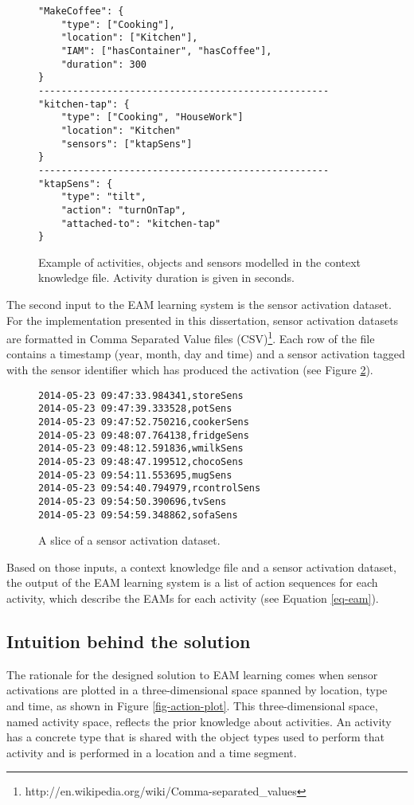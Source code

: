 \begin{figure}[htbp]
\begin{small}
\begin{lstlisting}
"MakeCoffee": {
	"type": ["Cooking"],
	"location": ["Kitchen"],
	"IAM": ["hasContainer", "hasCoffee"],
	"duration": 300
}
---------------------------------------------------
"kitchen-tap": {
	"type": ["Cooking", "HouseWork"]
	"location": "Kitchen"
	"sensors": ["ktapSens"]
}
---------------------------------------------------
"ktapSens": {
	"type": "tilt",
	"action": "turnOnTap",
	"attached-to": "kitchen-tap"
}
\end{lstlisting}
\end{small}
\caption{Example of activities, objects and sensors modelled in the context knowledge file. Activity duration is given in seconds.}
\label{fig-context-json}
\end{figure}

The second input to the EAM learning system is the sensor activation dataset. For the implementation presented in this dissertation, sensor activation datasets are formatted in Comma Separated Value files (CSV)\footnote{http://en.wikipedia.org/wiki/Comma-separated\_values}. Each row of the file contains a timestamp (year, month, day and time) and a sensor activation tagged with the sensor identifier which has produced the activation (see Figure \ref{fig-dataset}).


\begin{figure}[htbp]
\begin{small}
\begin{lstlisting}
2014-05-23 09:47:33.984341,storeSens
2014-05-23 09:47:39.333528,potSens
2014-05-23 09:47:52.750216,cookerSens
2014-05-23 09:48:07.764138,fridgeSens
2014-05-23 09:48:12.591836,wmilkSens
2014-05-23 09:48:47.199512,chocoSens
2014-05-23 09:54:11.553695,mugSens
2014-05-23 09:54:40.794979,rcontrolSens
2014-05-23 09:54:50.390696,tvSens
2014-05-23 09:54:59.348862,sofaSens
\end{lstlisting}
\end{small}
\caption{A slice of a sensor activation dataset.}
\label{fig-dataset}
\end{figure}

Based on those inputs, a context knowledge file and a sensor activation dataset, the output of the EAM learning system is a list of action sequences for each activity, which describe the EAMs for each activity (see Equation \ref{eq-eam}). 

\subsection{Intuition behind the solution}
The rationale for the designed solution to EAM learning comes when sensor activations are plotted in a three-dimensional space spanned by location, type and time, as shown in Figure \ref{fig-action-plot}. This three-dimensional space, named activity space, reflects the prior knowledge about activities. An activity has a concrete type that is shared with the object types used to perform that activity and is performed in a location and a time segment. 

